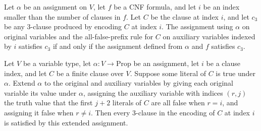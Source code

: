 \begin{lemma}
\label{SATTo3SAT.global_matches_local}
\leanok
{}
Let $\alpha$ be an assignment on $V$, let $f$ be a CNF formula, and let $i$ be an index
smaller than the number of clauses in $f$. Let $C$ be the clause at index $i$, and let
$c_3$ be any 3-clause produced by encoding $C$ at index $i$. The assignment using
$\alpha$ on original variables and the all-false-prefix rule for $C$ on auxiliary
variables indexed by $i$ satisfies $c_3$ if and only if the assignment defined from
$\alpha$ and $f$ satisfies $c_3$.
\end{lemma}

\begin{lemma}
\label{SATTo3SAT.transformClause_satisfied}
\leanok
{}
Let $V$ be a variable type, let $\alpha:V\to\mathrm{Prop}$ be an assignment, let $i$ be
a clause index, and let $C$ be a finite clause over $V$. Suppose some literal of $C$ is
true under $\alpha$. Extend $\alpha$ to the original and auxiliary variables by giving
each original variable its value under $\alpha$, assigning the auxiliary variable with
indices $(r,j)$ the truth value that the first $j+2$ literals of $C$ are all false when
$r=i$, and assigning it false when $r\ne i$. Then every 3-clause in the encoding of $C$
at index $i$ is satisfied by this extended assignment.
\end{lemma}

